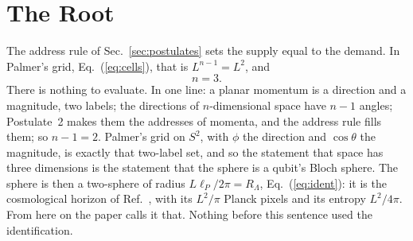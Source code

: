 \documentclass[aps,prd,twocolumn,superscriptaddress,nofootinbib]{revtex4-2}
\begin{document}
\section{The Root}
\label{sec:root}

The address rule of Sec.~\ref{sec:postulates} sets the supply equal to the demand. In Palmer's grid, Eq.~(\ref{eq:cells}), that is $L^{n-1} = L^2$, and
\begin{equation}
n = 3 .
\label{eq:exact}
\end{equation}
There is nothing to evaluate. In one line: a planar momentum is a direction and a magnitude, two labels; the directions of $n$-dimensional space have $n-1$ angles; Postulate~2 makes them the addresses of momenta, and the address rule fills them; so $n-1 = 2$. Palmer's grid on $S^2$, with $\phi$ the direction and $\cos\theta$ the magnitude, is exactly that two-label set, and so the statement that space has three dimensions is the statement that the sphere is a qubit's Bloch sphere. The sphere is then a two-sphere of radius $L\ell_P/2\pi = R_\Lambda$, Eq.~(\ref{eq:ident}): it is the cosmological horizon of Ref.~\cite{korytko2026}, with its $L^2/\pi$ Planck pixels and its entropy $L^2/4\pi$. From here on the paper calls it that. Nothing before this sentence used the identification.
\end{document}
